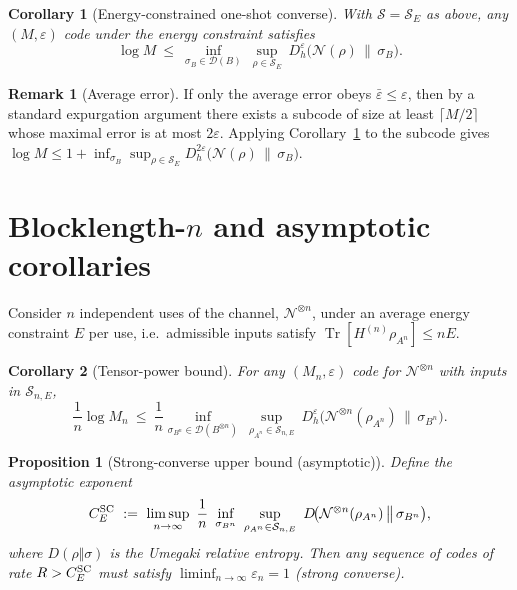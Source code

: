 \documentclass[11pt]{article}
\newtheorem{proposition}{Proposition}
\newtheorem{corollary}{Corollary}
\theoremstyle{definition}
\newtheorem{remark}{Remark}
\DeclareMathOperator{\Tr}{Tr}
\newcommand{\Dheps}[1]{D_h^{#1}}
\newcommand{\calN}{\mathcal{N}}
\newcommand{\calD}{\mathcal{D}}
\newcommand{\calS}{\mathcal{S}}
\begin{document}
\begin{corollary}[Energy-constrained one-shot converse]\label{cor:energy-one-shot}
With $\calS=\calS_E$ as above, any $(M,\varepsilon)$ code under the energy constraint satisfies
\begin{equation}\label{eq:energy-meta}
\log M \ \le\ \inf_{\sigma_B\in\calD(B)}\ \sup_{\rho\in\calS_E}\ \Dheps{\varepsilon}\!\big(\calN(\rho)\,\big\|\,\sigma_B\big).
\end{equation}
\end{corollary}

\begin{remark}[Average error]\label{rem:avg-error}
If only the average error obeys $\bar\varepsilon\le \varepsilon$, then by a standard expurgation argument there exists a subcode of size at least $\lceil M/2\rceil$ whose maximal error is at most $2\varepsilon$. Applying Corollary~\ref{cor:energy-one-shot} to the subcode gives
$\log M \le 1 + \inf_{\sigma_B}\sup_{\rho\in\calS_E} \Dheps{2\varepsilon}\!\big(\calN(\rho)\,\big\|\,\sigma_B\big)$.
\end{remark}

\section{Blocklength-$n$ and asymptotic corollaries}
Consider $n$ independent uses of the channel, $\calN^{\otimes n}$, under an average energy constraint $E$ per use, i.e.\ admissible inputs satisfy $\Tr[H^{(n)}\rho_{A^n}]\le nE$.

\begin{corollary}[Tensor-power bound]\label{cor:blocklength}
For any $(M_n,\varepsilon)$ code for $\calN^{\otimes n}$ with inputs in $\calS_{n,E}$,
\begin{equation}\label{eq:tensor-power}
\frac1n \log M_n \ \le\ \frac1n \inf_{\sigma_{B^n}\in\calD(B^{\otimes n})}\ \sup_{\rho_{A^n}\in\calS_{n,E}}\ \Dheps{\varepsilon}\!\big(\calN^{\otimes n}(\rho_{A^n})\,\big\|\,\sigma_{B^n}\big).
\end{equation}
\end{corollary}

\begin{proposition}[Strong-converse upper bound (asymptotic)]\label{prop:strong-converse}
Define the asymptotic exponent
\begin{equation}\label{eq:asymp-rate}
C_E^{\textup{SC}} \ :=\ \limsup_{n\to\infty}\ \frac1n\ \inf_{\sigma_{B^n}}\ \sup_{\rho_{A^n}\in\calS_{n,E}}\ D\!\big(\calN^{\otimes n}(\rho_{A^n})\,\big\|\,\sigma_{B^n}\big),
\end{equation}
where $D(\rho\Vert\sigma)$ is the Umegaki relative entropy.
Then any sequence of codes of rate $R>C_E^{\textup{SC}}$ must satisfy $\liminf_{n\to\infty}\varepsilon_n = 1$ (strong converse).
\end{proposition}
\end{document}
